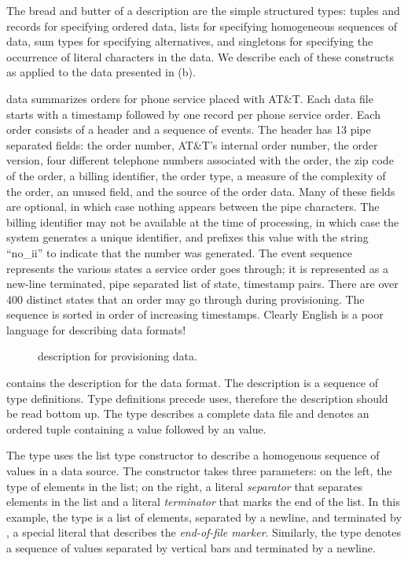 The bread and butter of a \padsml{} description are the simple
structured types: tuples and records for specifying ordered data,
lists for specifying homogeneous sequences of data, sum types for
specifying alternatives, and singletons for specifying the occurrence
of literal characters in the data.  We describe each of these
constructs as applied to the \dibbler{} data presented in
(b).

\dibbler{} data summarizes orders for phone service placed with AT\&T.
Each \dibbler{} data file starts with a timestamp followed by one
record per phone service order.  Each order consists of a header and a
sequence of events.  The header has 13 pipe separated fields: the
order number, AT\&T's internal order number, the order version, four
different telephone numbers associated with the order, the zip code of
the order, a billing identifier, the order type, a measure of the
complexity of the order, an unused field, and the source of the order
data.  Many of these fields are optional, in which case nothing
appears between the pipe characters.  The billing identifier may not
be available at the time of processing, in which case the system
generates a unique identifier, and prefixes this value with the string
``no\_ii'' to indicate that the number was generated. The event
sequence represents the various states a service order goes through;
it is represented as a new-line terminated, pipe separated list of
state, timestamp pairs.  There are over 400 distinct states that an
order may go through during provisioning.  The sequence is sorted in
order of increasing timestamps.  Clearly
English is a poor language for describing data formats!

\begin{figure}

  \caption{\padsml{} description for \dibbler{} provisioning data.}
  \label{figure:sirius_pml}
\end{figure}

 contains the \padsml{} description for the
\dibbler{} data format.  The description is a sequence of type
definitions.  Type definitions precede uses, therefore the description
should be read bottom up.
The type  describes a complete \dibbler{} data
file and denotes an ordered tuple containing a
 value followed by an  value.

The type  uses the list type constructor
 to describe a homogenous sequence of values in a data
source.  The  constructor takes three parameters: on the
left, the type of elements in the list; on the right, a literal
\emph{separator} that separates elements in the list and a literal
\emph{terminator} that marks the end of the list.  
In this example, the type  is a list of
 elements, separated by a newline, and terminated by
, a special literal that describes the \emph{end-of-file
  marker}.  Similarly, the  type denotes a
sequence of  values separated by vertical bars and
terminated by a newline.

